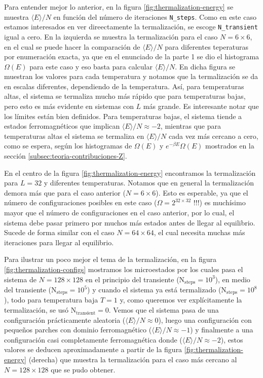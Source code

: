 \documentclass[%
 reprint,
 amsmath,amssymb,
 aps,
 pra,
]{revtex4-2}
\begin{document}
	Para entender mejor lo anterior, en la figura \ref{fig:thermalization-energy} se muestra $\langle E \rangle / N$ en función del número de iteraciones \texttt{N_steps}. Como en este caso estamos interesados en ver direectamente la termalización, se escoge \texttt{N_transient} igual a cero. En la izquierda se muestra la termalización para el caso $N = 6 \times 6$, en el cual se puede hacer la comparación de $\langle E \rangle / N$ para diferentes teperaturas por enumeración exacta, ya que en el enunciado de la parte 1 se dio el histograma $\Omega(E)$ para este caso y eso basta para calcular $\langle E \rangle / N$. En dicha figura se muestran los valores para cada temperatura y notamos que la termalización se da en escalas diferentes, dependiendo de la temperatura. Así, para temperaturas altas, el sistema se termaliza mucho más rápido que para temperaturas bajas, pero esto es más evidente en sistemas con $L$ más grande. Es interesante notar que los límites están bien definidos. Para temperaturas bajas, el sistema tiende a estados ferromagnéticos que implican  $\langle E \rangle / N \approx -2$, mientras que para temperaturas altas el sistema se termaliza en $\langle E \rangle / N$ cada vez más cercano a cero, como se espera, según los histogramas de $\Omega(E)$ y $e^{-\beta E}\Omega(E)$ mostrados en la sección \ref{subsec:teoria-contribuciones-Z}.
	
	En el centro de la figura \ref{fig:thermalization-energy} encontramos la termalización para $L=32$ y diferentes temperaturas. Notamos que en general la termalización demora más que para el caso anterior ($N = 6 \times 6$). Esto es esperable, ya que el número de configuraciones posibles en este caso ($\Omega = 2^{32 \times 32}$ !!!) es muchísimo mayor que el número de configuraciones en el caso anterior, por lo cual, el sistema debe pasar primero por muchos más estados antes de llegar al equilibrio. Sucede de forma similar con el caso $N=64 \times 64$, el cual necesita muchas más iteraciones para llegar al equilibrio. \linebreak
	
	Para ilustrar un poco mejor el tema de la termalización, en la figura \ref{fig:thermalization-configs} mostramos los microestados por los cuales pasa el sistema de $N=128 \times 128$ en el principio del transiente ($\mathrm{N_{steps}}=10^3$), en medio del transiente ($\mathrm{N_{steps}}=10^5$) y cuando el sistema ya está termalizado ($\mathrm{N_{steps}}=10^8$), todo para temperatura baja $T=1$ y, como queremos ver explícitamente la termalización, se usó $\mathrm{N_{transient}}=0$. Vemos que el sistema pasa de una configuración prácticamente aleatoria ($\langle E \rangle / N \approx 0$), luego una configuración con pequeños parches con dominio ferromagnético ($\langle E \rangle / N \approx -1$) y finalmente a una configuración casi completamente ferromagnética donde ($\langle E \rangle / N \approx -2$), estos valores se deducen aproximadamente a partir de la figura \ref{fig:thermalization-energy} (derecha) que muestra la termalización para el caso más cercano al $N = 128 \times 128$ que se pudo obtener.
\end{document}
